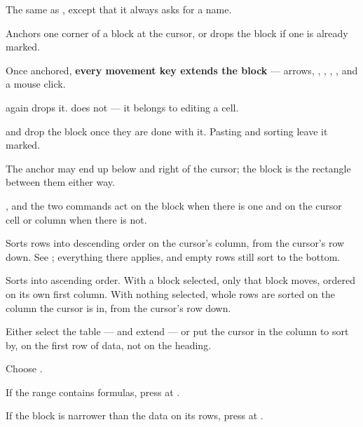 
The same as , except that it always asks for a name.


Anchors one corner of a block at the cursor, or drops the block if one is
already marked.

\begin{ccsteps}
\item Once anchored, \textbf{every movement key extends the block} --- arrows,
, , , , and a mouse click.
\item {} again drops it.  does not --- it belongs to
editing a cell.
\item {} and  drop the block once they are done
with it. Pasting and sorting leave it marked.
\item The anchor may end up below and right of the cursor; the block is the
rectangle between them either way.
\item {},  and the two  commands
act on the block when there is one and on the cursor cell or column when there
is not.
\end{ccsteps}


Sorts rows into descending order on the cursor's column, from the cursor's row
down. See ; everything there applies, and empty rows still
sort to the bottom.


Sorts into ascending order. With a block selected, only that block moves,
ordered on its own first column. With nothing selected, whole rows are sorted
on the column the cursor is in, from the cursor's row down.

\begin{ccprocedure}[]
\item Either select the table ---  and extend --- or put the
cursor in the column to sort by, on the first row of data, not on the heading.
\item Choose .
\item If the range contains formulas, press  at
.
\item If the block is narrower than the data on its rows, press  at
.
\end{ccprocedure}

